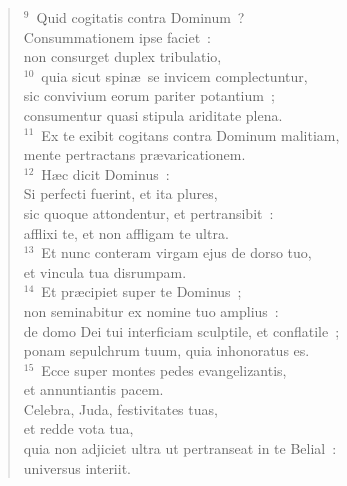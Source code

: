 \begin{flushleft}
\begin{verse}
${}^{9}$~Quid cogitatis contra Dominum~?\\ Consummationem ipse faciet~:\\ non consurget duplex tribulatio,\\
${}^{10}$~quia sicut spin\ae\ se invicem complectuntur,\\ sic convivium eorum pariter potantium~;\\ consumentur quasi stipula ariditate plena.\\
${}^{11}$~Ex te exibit cogitans contra Dominum malitiam,\\ mente pertractans pr\ae varicationem.\\
${}^{12}$~H\ae c dicit Dominus~:\\ Si perfecti fuerint, et ita plures,\\ sic quoque attondentur, et pertransibit~:\\ afflixi te, et non affligam te ultra.\\
${}^{13}$~Et nunc conteram virgam ejus de dorso tuo,\\ et vincula tua disrumpam.\\
${}^{14}$~Et pr\ae cipiet super te Dominus~;\\ non seminabitur ex nomine tuo amplius~:\\ de domo Dei tui interficiam sculptile, et conflatile~;\\ ponam sepulchrum tuum, quia inhonoratus es.\\
${}^{15}$~Ecce super montes pedes evangelizantis,\\ et annuntiantis pacem.\\ Celebra, Juda, festivitates tuas,\\ et redde vota tua,\\ quia non adjiciet ultra ut pertranseat in te Belial~:\\ universus interiit.\end{verse}\end{flushleft}


